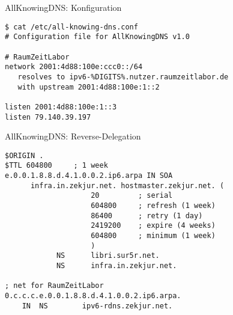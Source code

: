 \documentclass[xetex,serif,compress]{beamer}
\begin{document}



\begin{frame}[fragile]{AllKnowingDNS: Konfiguration}
    \begin{lstlisting}[basicstyle=\small\ttfamily]
$ cat /etc/all-knowing-dns.conf
# Configuration file for AllKnowingDNS v1.0

# RaumZeitLabor
network 2001:4d88:100e:ccc0::/64
   resolves to ipv6-%DIGITS%.nutzer.raumzeitlabor.de
   with upstream 2001:4d88:100e:1::2

listen 2001:4d88:100e:1::3
listen 79.140.39.197
    \end{lstlisting}
\end{frame}

\begin{frame}[fragile]{AllKnowingDNS: Reverse-Delegation}
    \begin{lstlisting}[basicstyle=\small\ttfamily]
$ORIGIN .
$TTL 604800     ; 1 week
e.0.0.1.8.8.d.4.1.0.0.2.ip6.arpa IN SOA
      infra.in.zekjur.net. hostmaster.zekjur.net. (
                    20         ; serial
                    604800     ; refresh (1 week)
                    86400      ; retry (1 day)
                    2419200    ; expire (4 weeks)
                    604800     ; minimum (1 week)
                    )
            NS      libri.sur5r.net.
            NS      infra.in.zekjur.net.

; net for RaumZeitLabor
0.c.c.c.e.0.0.1.8.8.d.4.1.0.0.2.ip6.arpa.
    IN  NS        ipv6-rdns.zekjur.net.
    \end{lstlisting}
\end{frame}
\end{document}
